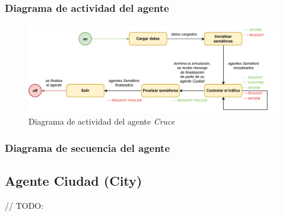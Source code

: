 \subsubsection{Diagrama de actividad del agente}
\begin{figure}[H]
    \centering
    \includegraphics[width=1\linewidth]{text/image/DAgen-DA-Crossroad.pdf}
    \caption{Diagrama de actividad del agente \textit{Cruce}}
    \label{fig:da_agente_cruce}
\end{figure}

\subsubsection{Diagrama de secuencia del agente}

\subsection{Agente Ciudad (City)}
// TODO:

